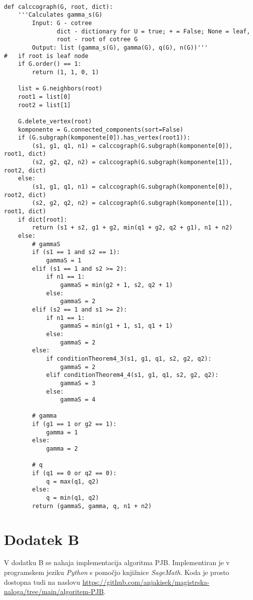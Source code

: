 \documentclass[12pt,a4paper,twoside]{article}
\theoremstyle{definition} %
\theoremstyle{plain} %
\numberwithin{equation}{section}  %
\begin{document}
\begin{verbatim}

def calccograph(G, root, dict):
    '''Calculates gamma_s(G) 
        Input: G - cotree
               dict - dictionary for U = true; + = False; None = leaf,
               root - root of cotree G
        Output: list (gamma_s(G), gamma(G), q(G), n(G))'''
#   if root is leaf node
    if G.order() == 1:
        return (1, 1, 0, 1)
    
    list = G.neighbors(root)
    root1 = list[0]
    root2 = list[1]
    
    G.delete_vertex(root)
    komponente = G.connected_components(sort=False)
    if (G.subgraph(komponente[0]).has_vertex(root1)):
        (s1, g1, q1, n1) = calccograph(G.subgraph(komponente[0]), root1, dict)
        (s2, g2, q2, n2) = calccograph(G.subgraph(komponente[1]), root2, dict)
    else:
        (s1, g1, q1, n1) = calccograph(G.subgraph(komponente[0]), root2, dict)
        (s2, g2, q2, n2) = calccograph(G.subgraph(komponente[1]), root1, dict)
    if dict[root]:
        return (s1 + s2, g1 + g2, min(q1 + g2, q2 + g1), n1 + n2)
    else:
        # gammaS
        if (s1 == 1 and s2 == 1):
            gammaS = 1
        elif (s1 == 1 and s2 >= 2):
            if n1 == 1:
                gammaS = min(g2 + 1, s2, q2 + 1)
            else:
                gammaS = 2
        elif (s2 == 1 and s1 >= 2):
            if n1 == 1:
                gammaS = min(g1 + 1, s1, q1 + 1)
            else:
                gammaS = 2
        else:
            if conditionTheorem4_3(s1, g1, q1, s2, g2, q2):
                gammaS = 2
            elif conditionTheorem4_4(s1, g1, q1, s2, g2, q2):
                gammaS = 3
            else:
                gammaS = 4
        
        # gamma
        if (g1 == 1 or g2 == 1):
            gamma = 1
        else:
            gamma = 2
        
        # q
        if (q1 == 0 or q2 == 0):
            q = max(q1, q2)
        else:
            q = min(q1, q2)
        return (gammaS, gamma, q, n1 + n2)
\end{verbatim}


\section*{Dodatek B}\label{sec:dodatekB}
V dodatku B se nahaja implementacija algoritma PJB. Implementiran je v programskem jeziku \emph{Python} s pomočjo knjižnice \emph{SageMath}. Koda je prosto dostopna tudi na naslovu \url{https://github.com/anjakisek/magistrska-naloga/tree/main/algoritem-PJB}.
\end{document}
